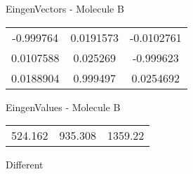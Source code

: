 \begin{multicols}{2}
\begin{center}
\vtab
 EingenVectors - Molecule B     \\
\vtab
\begin{tabular}{|c c c|}
-0.999764	 & 	0.0191573	 & 	-0.0102761	 \\
0.0107588	 & 	0.025269	 & 	-0.999623	 \\
0.0188904	 & 	0.999497	 & 	0.0254692
\end{tabular}

\vtab
 EingenValues - Molecule B     \\
\vtab
\begin{tabular}{|c c c|}
524.162	 & 	935.308	 & 	1359.22	 \\
\end{tabular}

\end{center}
\end{multicols}
\begin{center}
\vtab
\vtab
\textcolor{NavyBlue}{\Large Different}
\end{center}

 \newpage

